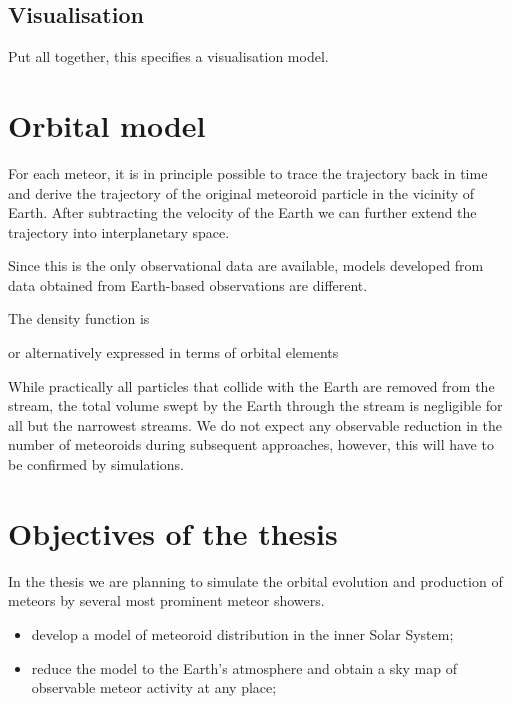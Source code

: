     \subsection{Visualisation}
        Put all together, this specifies a visualisation model.


\section{Orbital model} \label{po}
    For each meteor, it is in principle possible to trace the trajectory back in time
    and derive the trajectory of the original meteoroid particle in the vicinity of Earth.
    After subtracting the velocity of the Earth we can further extend the trajectory
    into interplanetary space.

    Since this is the only observational data are available,
    models developed from data obtained from Earth-based observations are different.

  


    The density function is 
    \eqn{eq:po-rv}{
        \varrho(\vec{r}, \vec{v}, t) \in \left[0, \infty\right).
    }

    or alternatively expressed in terms of orbital elements

    While practically all particles that collide with the Earth are removed from the stream,
    the total volume swept by the Earth through the stream is negligible for all but the narrowest streams.
    We do not expect any observable reduction in the number of meteoroids during subsequent approaches,
    however, this will have to be confirmed by simulations.

\section{Objectives of the thesis} \label{iO}
    In the thesis we are planning to simulate the orbital evolution and production of meteors
    by several most prominent meteor showers.

    \begin{itemize}
        \item develop a model of meteoroid distribution in the inner Solar System;
        \item reduce the model to the Earth's atmosphere and obtain a sky map
            of observable meteor activity at any place;
    \end{itemize}

